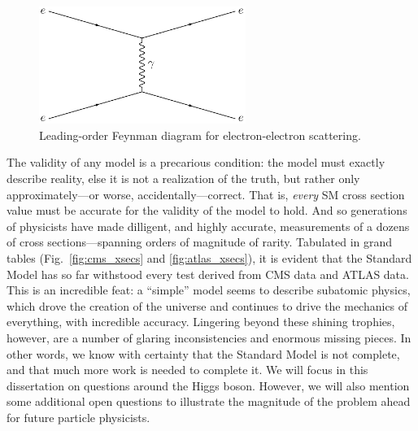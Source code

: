 \begin{figure}[htb]
    \centering
    \includegraphics[width=0.6\textwidth]{fig/feynman/other/ee_scattering.pdf}
    \caption{
        Leading-order Feynman diagram for electron-electron scattering. 
    }
    \label{fig:ee_scattering}
\end{figure}

The validity of any model is a precarious condition: the model must exactly describe reality, else it is not a realization of the truth, but rather only approximately---or worse, accidentally---correct. 
That is, \textit{every} SM cross section value must be accurate for the validity of the model to hold. 
And so generations of physicists have made dilligent, and highly accurate, measurements of a dozens of cross sections---spanning orders of magnitude of rarity. 
Tabulated in grand tables (Fig.~\ref{fig:cms_xsecs} and \ref{fig:atlas_xsecs}), it is evident that the Standard Model has so far withstood every test derived from CMS data and ATLAS data. 
This is an incredible feat: a ``simple'' model seems to describe subatomic physics, which drove the creation of the universe and continues to drive the mechanics of everything, with incredible accuracy. 
Lingering beyond these shining trophies, however, are a number of glaring inconsistencies and enormous missing pieces. 
In other words, we know with certainty that the Standard Model is not complete, and that much more work is needed to complete it. 
We will focus in this dissertation on questions around the Higgs boson. 
However, we will also mention some additional open questions to illustrate the magnitude of the problem ahead for future particle physicists. 

